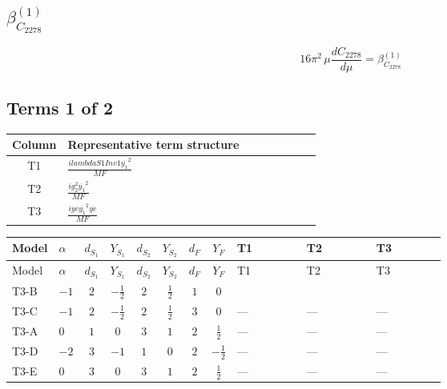 \documentclass[8pt]{article}
\begin{document}
\begin{landscape}
\section*{$\beta_{C_{2278}}^{(1)}$}
\[16\pi^2\,\mu\frac{d C_{2278}}{d\mu}=\beta_{C_{2278}}^{(1)}\]
\subsection*{Terms 1 of 2}
\begin{center}
\begin{tabular}{@{}c >{\raggedright\arraybackslash}p{0.82\linewidth}@{}}
\toprule
Column & Representative term structure \\
\midrule
T1 & \(\displaystyle \frac{i lambdaS1Inv1 \overline{y_{1}}^{2}}{MF}\) \\
\midrule
T2 & \(\displaystyle \frac{i g_{2}^{2} \overline{y_{1}}^{2}}{MF}\) \\
\midrule
T3 & \(\displaystyle \frac{i ye \overline{y_{1}}^{2} \overline{ye}}{MF}\) \\
\midrule
\bottomrule
\end{tabular}
\end{center}
\smallskip
\tiny
\begin{longtable}{@{}llcccccc >{\raggedright\arraybackslash}p{0.21\linewidth} >{\raggedright\arraybackslash}p{0.21\linewidth} >{\raggedright\arraybackslash}p{0.21\linewidth}@{}}
\toprule
Model & $\alpha$ & $d_{S_1}$ & $Y_{S_1}$ & $d_{S_2}$ & $Y_{S_2}$ & $d_F$ & $Y_F$ & T1 & T2 & T3 \\
\midrule
\endfirsthead
\toprule
Model & $\alpha$ & $d_{S_1}$ & $Y_{S_1}$ & $d_{S_2}$ & $Y_{S_2}$ & $d_F$ & $Y_F$ & T1 & T2 & T3 \\
\midrule
\endhead
T3-B & $-1$ & $2$ & $-\frac{1}{2}$ & $2$ & $\frac{1}{2}$ & $1$ & $0$ & \scriptsize\adjustbox{max width=\linewidth}{$\begin{gathered} \frac{i lambdaS1Inv1 \overline{y_{1}}^{2}}{2 MF}\end{gathered}$} & \scriptsize\adjustbox{max width=\linewidth}{$\begin{gathered} \frac{3 i g_{2}^{2} \overline{y_{1}}^{2}}{4 MF}\end{gathered}$} & \scriptsize\adjustbox{max width=\linewidth}{$\begin{gathered} - \frac{i ye \overline{y_{1}}^{2} \overline{ye}}{4 MF}\end{gathered}$} \\
\midrule
T3-C & $-1$ & $2$ & $-\frac{1}{2}$ & $2$ & $\frac{1}{2}$ & $3$ & $0$ & --- & --- & --- \\
\midrule
T3-A & $0$ & $1$ & $0$ & $3$ & $1$ & $2$ & $\frac{1}{2}$ & --- & --- & --- \\
\midrule
T3-D & $-2$ & $3$ & $-1$ & $1$ & $0$ & $2$ & $-\frac{1}{2}$ & --- & --- & --- \\
\midrule
T3-E & $0$ & $3$ & $0$ & $3$ & $1$ & $2$ & $\frac{1}{2}$ & --- & --- & --- \\
\midrule
\bottomrule
\end{longtable}
\clearpage

\end{landscape}
\end{document}
